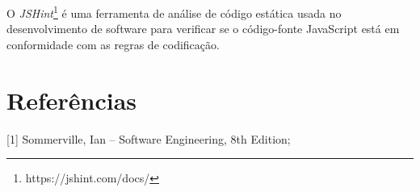 \documentclass[a4paper, 12pt]{article}
\begin{document}
O \textit{JSHint}\footnote{https://jshint.com/docs/} é uma ferramenta de análise de código estática usada no desenvolvimento de software para verificar se o código-fonte JavaScript está em conformidade com as regras de codificação.

\newpage
\section{Referências}

[1] Sommerville, Ian -- Software Engineering, 8th Edition;
\end{document}
